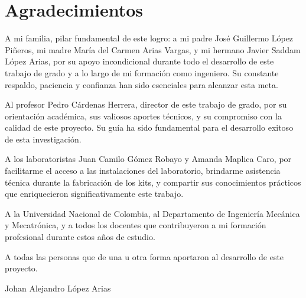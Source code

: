 \chapter*{\sffamily Agradecimientos}
%

A mi familia, pilar fundamental de este logro: a mi padre José Guillermo López Piñeros, mi madre María del Carmen Arias Vargas, y mi hermano Javier Saddam López Arias, por su apoyo incondicional durante todo el desarrollo de este trabajo de grado y a lo largo de mi formación como ingeniero. Su constante respaldo, paciencia y confianza han sido esenciales para alcanzar esta meta.

Al profesor Pedro Cárdenas Herrera, director de este trabajo de grado, por su orientación académica, sus valiosos aportes técnicos, y su compromiso con la calidad de este proyecto. Su guía ha sido fundamental para el desarrollo exitoso de esta investigación.

A los laboratoristas Juan Camilo Gómez Robayo y Amanda Maplica Caro, por facilitarme el acceso a las instalaciones del laboratorio, brindarme asistencia técnica durante la fabricación de los kits, y compartir sus conocimientos prácticos que enriquecieron significativamente este trabajo.

A la Universidad Nacional de Colombia, al Departamento de Ingeniería Mecánica y Mecatrónica, y a todos los docentes que contribuyeron a mi formación profesional durante estos años de estudio.

A todas las personas que de una u otra forma aportaron al desarrollo de este proyecto.

\vspace{1cm}

\begin{flushright}
Johan Alejandro López Arias
\end{flushright}